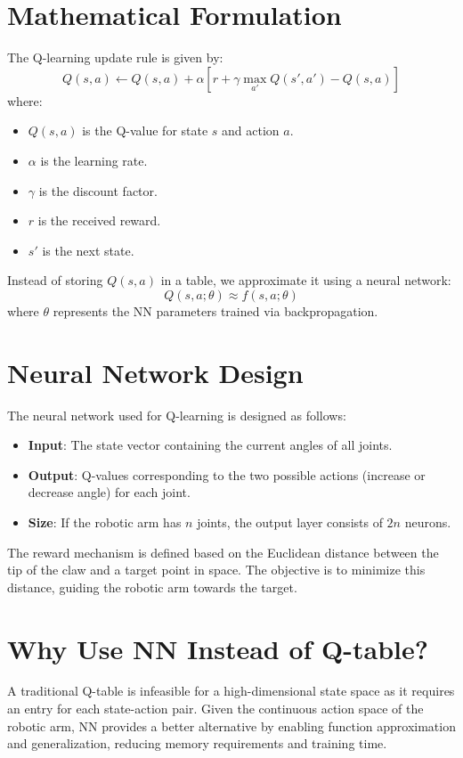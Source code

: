 \documentclass{article}
\begin{document}
\section{Mathematical Formulation}
The Q-learning update rule is given by:
\begin{equation}
    Q(s, a) \leftarrow Q(s, a) + \alpha \left[ r + \gamma \max_{a'} Q(s', a') - Q(s, a) \right]
\end{equation}
where:
\begin{itemize}
    \item $Q(s, a)$ is the Q-value for state $s$ and action $a$.
    \item $\alpha$ is the learning rate.
    \item $\gamma$ is the discount factor.
    \item $r$ is the received reward.
    \item $s'$ is the next state.
\end{itemize}
Instead of storing $Q(s,a)$ in a table, we approximate it using a neural network:
\begin{equation}
    Q(s, a; \theta) \approx f(s, a; \theta)
\end{equation}
where $\theta$ represents the NN parameters trained via backpropagation.

\section{Neural Network Design}
The neural network used for Q-learning is designed as follows:
\begin{itemize}
    \item \textbf{Input}: The state vector containing the current angles of all joints.
    \item \textbf{Output}: Q-values corresponding to the two possible actions (increase or decrease angle) for each joint.
    \item \textbf{Size}: If the robotic arm has $n$ joints, the output layer consists of $2n$ neurons.
\end{itemize}
The reward mechanism is defined based on the Euclidean distance between the tip of the claw and a target point in space. The objective is to minimize this distance, guiding the robotic arm towards the target.

\section{Why Use NN Instead of Q-table?}
A traditional Q-table is infeasible for a high-dimensional state space as it requires an entry for each state-action pair. Given the continuous action space of the robotic arm, NN provides a better alternative by enabling function approximation and generalization, reducing memory requirements and training time.
\end{document}
